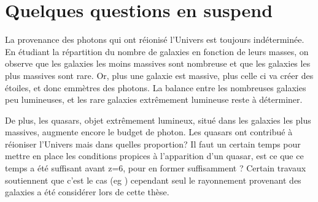 %
%


\section{Quelques questions en suspend}



La provenance des photons qui ont réionisé l'Univers est toujours indéterminée.
En étudiant la répartition du nombre de galaxies en fonction de leurs masses, on observe que les galaxies les moins massives sont nombreuse et que les galaxies les plus massives sont rare.
Or, plus une galaxie est massive, plus celle ci va créer des étoiles, et donc emmètres des photons.
La balance entre les nombreuses galaxies peu lumineuses, et les rare galaxies extrêmement lumineuse reste à déterminer.

De plus, les quasars, objet extrêmement lumineux, situé dans les galaxies les plus massives, augmente encore le budget de photon.
Les quasars ont contribué à réioniser l'Univers mais dans quelles proportion?
Il faut un certain temps pour mettre en place les conditions propices à l'apparition d'un quasar, est ce que ce temps a été suffisant avant z=6, pour en former suffisamment ?
Certain travaux soutiennent que c'est le cas (eg \cite{chardin_large-scale_2017}) cependant seul le rayonnement provenant des galaxies a été considérer lors de cette thèse.

